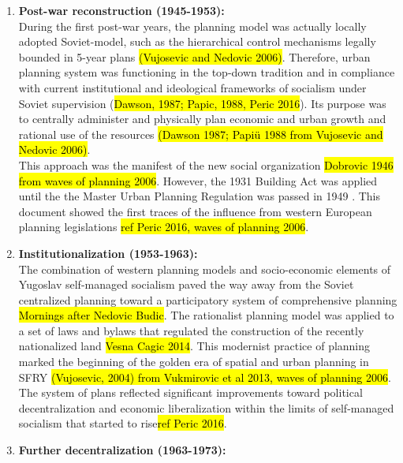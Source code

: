 \documentclass[11pt]{report}
\begin{document}
\begin{enumerate}
\item \textbf{Post-war reconstruction (1945-1953):}
\\
During the first post-war years, the planning model was actually locally adopted Soviet-model, such as the hierarchical  control  mechanisms legally bounded in 5-year plans \hl{(Vujosevic and Nedovic 2006)}.
Therefore, urban planning system was functioning in the top-down tradition and in compliance with current institutional and ideological frameworks of socialism under Soviet supervision (\hl{Dawson, 1987; Papic, 1988, Peric 2016}).
Its purpose was to centrally administer and physically plan economic and urban growth and rational use of the resources \hl{(Dawson  1987; Papiü 1988 from Vujosevic and Nedovic 2006)}. 
\\
This approach was the manifest of the new social organization \hl{Dobrovic 1946 from waves of planning 2006}.
However, the 1931 Building Act was applied until the the Master Urban Planning Regulation was passed in 1949 \cite{waves of planning 2006}.
This document showed the first traces of the influence from western European planning legislations \hl{ref Peric 2016, waves of planning 2006}.

\item \textbf{Institutionalization (1953-1963):}
\\
The combination of western planning models and socio-economic elements of Yugoslav self-managed socialism paved the way away from the Soviet centralized planning toward a participatory system of comprehensive planning
\hl{Mornings after Nedovic Budic}.
The rationalist planning model was applied to a set of laws and bylaws that regulated the construction of the recently nationalized land \hl{Vesna Cagic 2014}.
This modernist practice of planning marked the beginning of the golden era of spatial and urban planning in SFRY
\hl{(Vujosevic, 2004) from Vukmirovic et al 2013, waves of planning 2006}.
The system of plans reflected significant improvements toward political decentralization and economic liberalization within the limits of self-managed socialism that started to rise\hl{ref Peric 2016}.

\item \textbf{Further decentralization (1963-1973):}


\end{enumerate}
\end{document}
